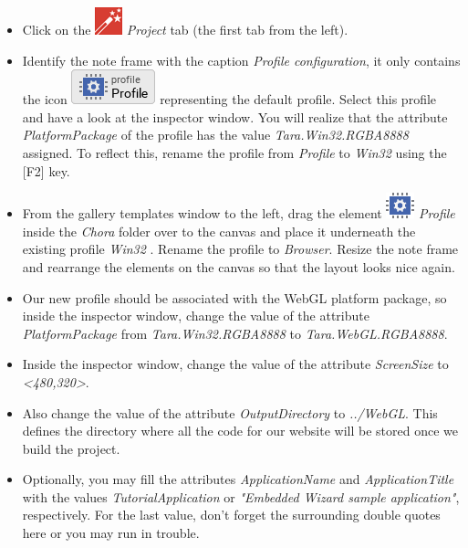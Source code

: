\documentclass[
  a4paper,
,tablecaptionabove
]{scrbook}
\begin{document}
\begin{itemize}
\item
  Click on the
  \includegraphics{./../asciidoc/modules/ROOT/assets/images/icons/EmbeddedWizardIcon.png}
  \emph{Project} tab (the first tab from the left).
\item
  Identify the note frame with the caption \emph{Profile configuration},
  it only contains the icon
  \includegraphics{./../asciidoc/modules/ROOT/assets/images/icons/DefaultProfileIcon.png}
  representing the default profile. Select this profile and have a look
  at the inspector window. You will realize that the attribute
  \emph{PlatformPackage} of the profile has the value
  \emph{Tara.Win32.RGBA8888} assigned. To reflect this, rename the
  profile from \emph{Profile} to \emph{Win32} using the {[}F2{]}
  key.
\item
  From the gallery templates window to the left, drag the element
  \includegraphics{./../asciidoc/modules/ROOT/assets/images/icons/ProfileIcon.png}
  \emph{Profile} inside the \emph{Chora} folder over to the canvas and
  place it underneath the existing profile \emph{Win32} . Rename the
  profile to \emph{Browser}. Resize the note frame and rearrange the
  elements on the canvas so that the layout looks nice again.
\item
  Our new profile should be associated with the WebGL platform package,
  so inside the inspector window, change the value of the attribute
  \emph{PlatformPackage} from \emph{Tara.Win32.RGBA8888} to
  \emph{Tara.WebGL.RGBA8888}.
\item
  Inside the inspector window, change the value of the attribute
  \emph{ScreenSize} to \emph{\textless480,320\textgreater{}}.
\item
  Also change the value of the attribute \emph{OutputDirectory} to
  \emph{../WebGL}. This defines the directory where all the code for our
  website will be stored once we build the project.
\item
  Optionally, you may fill the attributes \emph{ApplicationName} and
  \emph{ApplicationTitle} with the values \emph{TutorialApplication} or
  \emph{"Embedded Wizard sample application"}, respectively. For the
  last value, don't forget the surrounding double quotes here or you may
  run in trouble.
\end{itemize}
\end{document}
